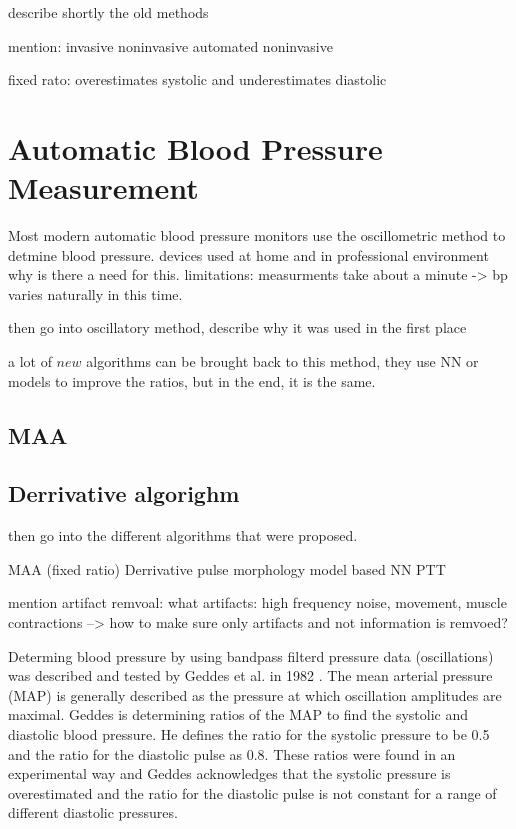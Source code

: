describe shortly the old methods

mention:
invasive
noninvasive
automated noninvasive

 \cite{Chandrasekhar2019}
fixed rato: overestimates systolic and underestimates diastolic

\section{Automatic Blood Pressure Measurement}
Most modern automatic blood pressure monitors use the oscillometric method to detmine blood pressure. devices used at home and in professional environment
why is there a need for this.
limitations:
measurments take about a minute -> bp varies naturally in this time.

then go into oscillatory method, describe why it was used in the first place

a lot of $new$ algorithms can be brought back to this method, they use NN or models to improve the ratios, but in the end, it is the same.

\subsection{MAA}
\subsection{Derrivative algorighm}
then go into the different algorithms that were proposed.


MAA (fixed ratio)
Derrivative
pulse morphology
model based
NN
PTT

mention artifact remvoal:
what artifacts: high frequency noise, movement, muscle contractions
 --> how to make sure only artifacts and not information is remvoed?


Determing blood pressure by using bandpass filterd pressure data (oscillations) was described and tested by Geddes et al. in 1982 \cite{Geddes1982}. The mean arterial pressure (MAP) is generally described as the pressure at which oscillation amplitudes are maximal. Geddes is determining ratios of the MAP to find the systolic and diastolic blood pressure. He defines the ratio for the systolic pressure to be 0.5 and the ratio for the diastolic pulse as 0.8. These ratios were found in an experimental way and Geddes acknowledges that the systolic pressure is overestimated and the ratio for the diastolic pulse is not constant for a range of different diastolic pressures.

